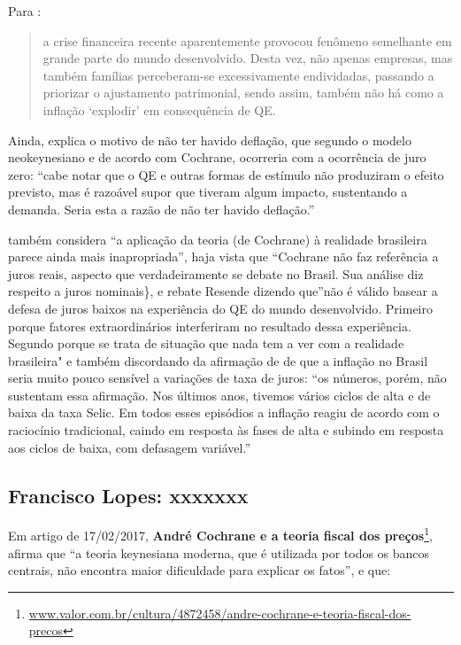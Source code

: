 \documentclass[]{article}
\let\rmarkdownfootnote\footnote%
\def\footnote{\protect\rmarkdownfootnote}
\begin{document}
Para :

\begin{quote}
a crise financeira recente aparentemente provocou fenômeno semelhante em
grande parte do mundo desenvolvido. Desta vez, não apenas empresas, mas
também famílias perceberam-se excessivamente endividadas, passando a
priorizar o ajustamento patrimonial, sendo assim, também não há como a
inflação `explodir' em consequência de QE.
\end{quote}

Ainda,  explica o motivo de não ter havido
deflação, que segundo o modelo neokeynesiano e de acordo com Cochrane,
ocorreria com a ocorrência de juro zero: ``cabe notar que o QE e outras
formas de estímulo não produziram o efeito previsto, mas é razoável
supor que tiveram algum impacto, sustentando a demanda. Seria esta a
razão de não ter havido deflação.''

 também considera ``a aplicação da teoria (de
Cochrane) à realidade brasileira parece ainda mais inapropriada'', haja
vista que ``Cochrane não faz referência a juros reais, aspecto que
verdadeiramente se debate no Brasil. Sua análise diz respeito a juros
nominais\}, e rebate Resende dizendo que''não é válido basear a defesa
de juros baixos na experiência do QE do mundo desenvolvido. Primeiro
porque fatores extraordinários interferiram no resultado dessa
experiência. Segundo porque se trata de situação que nada tem a ver com
a realidade brasileira" e também discordando da afirmação de
 de que a inflação no Brasil seria muito
pouco sensível a variações de taxa de juros: ``os números, porém, não
sustentam essa afirmação. Nos últimos anos, tivemos vários ciclos de
alta e de baixa da taxa Selic. Em todos esses episódios a inflação
reagiu de acordo com o raciocínio tradicional, caindo em resposta às
fases de alta e subindo em resposta aos ciclos de baixa, com defasagem
variável.''

\subsection{Francisco Lopes: xxxxxxx}\label{francisco-lopes-xxxxxxx}

Em artigo de 17/02/2017, \textbf{André Cochrane e a teoria fiscal dos
preços}\footnote{\href{http://www.valor.com.br/cultura/4872458/andre-cochrane-e-teoria-fiscal-dos-precos}{www.valor.com.br/cultura/4872458/andre-cochrane-e-teoria-fiscal-dos-precos}},
 afirma que ``a teoria keynesiana moderna, que é
utilizada por todos os bancos centrais, não encontra maior dificuldade
para explicar os fatos'', e que:
\end{document}
